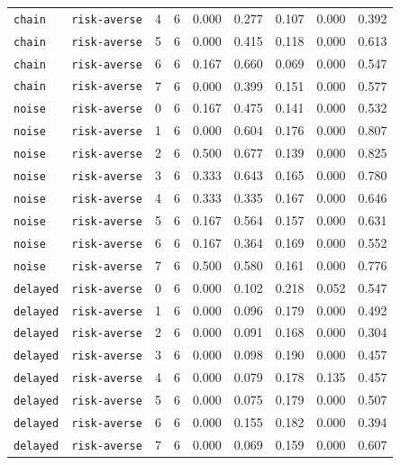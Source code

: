 \documentclass{article}
\begin{document}
\begin{center}
\begin{tabular}{lllcccccc}
\texttt{chain} & \texttt{risk-averse} & 4 & 6 & 0.000 & 0.277 & 0.107 & 0.000 & 0.392 \\
\texttt{chain} & \texttt{risk-averse} & 5 & 6 & 0.000 & 0.415 & 0.118 & 0.000 & 0.613 \\
\texttt{chain} & \texttt{risk-averse} & 6 & 6 & 0.167 & 0.660 & 0.069 & 0.000 & 0.547 \\
\texttt{chain} & \texttt{risk-averse} & 7 & 6 & 0.000 & 0.399 & 0.151 & 0.000 & 0.577 \\
\texttt{noise} & \texttt{risk-averse} & 0 & 6 & 0.167 & 0.475 & 0.141 & 0.000 & 0.532 \\
\texttt{noise} & \texttt{risk-averse} & 1 & 6 & 0.000 & 0.604 & 0.176 & 0.000 & 0.807 \\
\texttt{noise} & \texttt{risk-averse} & 2 & 6 & 0.500 & 0.677 & 0.139 & 0.000 & 0.825 \\
\texttt{noise} & \texttt{risk-averse} & 3 & 6 & 0.333 & 0.643 & 0.165 & 0.000 & 0.780 \\
\texttt{noise} & \texttt{risk-averse} & 4 & 6 & 0.333 & 0.335 & 0.167 & 0.000 & 0.646 \\
\texttt{noise} & \texttt{risk-averse} & 5 & 6 & 0.167 & 0.564 & 0.157 & 0.000 & 0.631 \\
\texttt{noise} & \texttt{risk-averse} & 6 & 6 & 0.167 & 0.364 & 0.169 & 0.000 & 0.552 \\
\texttt{noise} & \texttt{risk-averse} & 7 & 6 & 0.500 & 0.580 & 0.161 & 0.000 & 0.776 \\
\texttt{delayed} & \texttt{risk-averse} & 0 & 6 & 0.000 & 0.102 & 0.218 & 0.052 & 0.547 \\
\texttt{delayed} & \texttt{risk-averse} & 1 & 6 & 0.000 & 0.096 & 0.179 & 0.000 & 0.492 \\
\texttt{delayed} & \texttt{risk-averse} & 2 & 6 & 0.000 & 0.091 & 0.168 & 0.000 & 0.304 \\
\texttt{delayed} & \texttt{risk-averse} & 3 & 6 & 0.000 & 0.098 & 0.190 & 0.000 & 0.457 \\
\texttt{delayed} & \texttt{risk-averse} & 4 & 6 & 0.000 & 0.079 & 0.178 & 0.135 & 0.457 \\
\texttt{delayed} & \texttt{risk-averse} & 5 & 6 & 0.000 & 0.075 & 0.179 & 0.000 & 0.507 \\
\texttt{delayed} & \texttt{risk-averse} & 6 & 6 & 0.000 & 0.155 & 0.182 & 0.000 & 0.394 \\
\texttt{delayed} & \texttt{risk-averse} & 7 & 6 & 0.000 & 0.069 & 0.159 & 0.000 & 0.607 \\
\bottomrule
\end{tabular}
\end{center}
\end{document}
